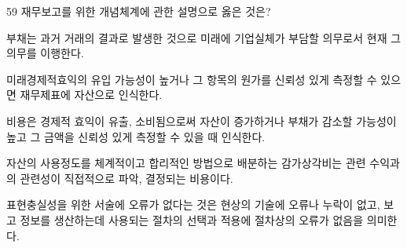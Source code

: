 \begin{question}{59}
재무보고를 위한 개념체계에 관한 설명으로 옳은 것은?
\begin{choices}
  \item 부채는 과거 거래의 결과로 발생한 것으로 미래에 기업실체가 부담할 의무로서 현재 그 의무를 이행한다.
  \item 미래경제적효익의 유입 가능성이 높거나 그 항목의 원가를 신뢰성 있게 측정할 수 있으면 재무제표에 자산으로 인식한다.
  \item 비용은 경제적 효익이 유출, 소비됨으로써 자산이 증가하거나 부채가 감소할 가능성이 높고 그 금액을 신뢰성 있게 측정할 수 있을 때 인식한다.
  \item 자산의 사용정도를 체계적이고 합리적인 방법으로 배분하는 감가상각비는 관련 수익과의 관련성이 직접적으로 파악, 결정되는 비용이다.
  \item 표현충실성을 위한 서술에 오류가 없다는 것은 현상의 기술에 오류나 누락이 없고, 보고 정보를 생산하는데 사용되는 절차의 선택과 적용에 절차상의 오류가 없음을 의미한다.
\end{choices}
\end{question}
